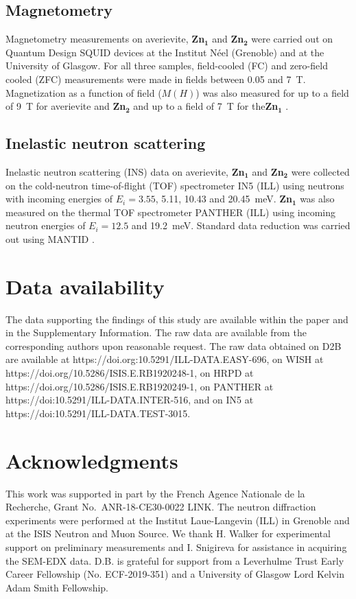 \documentclass[
sn-nature,
Numbered,
iicol]
{sn-jnl}%
\begin{document}
\subsection*{Magnetometry}
\label{SecSquid}
Magnetometry measurements on averievite, {\bf Zn$\mathbf {_1}$} and {\bf Zn$\mathbf {_2}$} were carried out on Quantum Design  SQUID devices at the Institut N\'eel (Grenoble) and at the University of Glasgow. For all three samples, field-cooled (FC) and zero-field cooled (ZFC) measurements were made in fields between 0.05 and 7~T. Magnetization as a function of field ($M(H)$) was also measured for up to a field of 9~T for averievite and {\bf Zn$\mathbf {_2}$} and up to a field of 7~T for the{\bf Zn$\mathbf {_1}$} .

\subsection*{Inelastic neutron scattering}
\label{SecINS}
Inelastic neutron scattering (INS) data on averievite, {\bf Zn$\mathbf {_1}$} and {\bf Zn$\mathbf {_2}$} were collected on the cold-neutron time-of-flight (TOF) spectrometer IN5 (ILL) using neutrons with incoming energies of $E_i=3.55$, 5.11, 10.43 and 20.45~meV. {\bf Zn$\mathbf {_1}$}  was also measured on the thermal TOF spectrometer PANTHER (ILL) \cite{Fak2022PantherILL, Panther_avv} using incoming neutron energies of $E_i=12.5$ and 19.2~meV.
Standard data reduction was carried out using MANTID
\cite{Mantid}. 


\section{Data availability}
The data supporting the findings of this study are available within the paper and in the Supplementary Information. The raw data are available from the corresponding authors upon reasonable request. 
The raw data obtained on D2B are available at https://doi.org:10.5291/ILL-DATA.EASY-696, 
on WISH at https://doi.org/10.5286/ISIS.E.RB1920248-1, 
on HRPD at https://doi.org/10.5286/ISIS.E.RB1920249-1, 
on PANTHER at https://doi:10.5291/ILL-DATA.INTER-516, 
and on IN5 at https://doi:10.5291/ILL-DATA.TEST-3015.



\section{Acknowledgments}
This work was supported in part by the French Agence Nationale de la Recherche, Grant No.\ ANR-18-CE30-0022 LINK. 
The neutron diffraction experiments were performed at the Institut Laue-Langevin (ILL) in Grenoble and at the ISIS Neutron and Muon Source. We thank H. Walker for experimental support on preliminary measurements and I. Snigireva for assistance in acquiring the SEM-EDX data. D.B. is grateful for support  from a Leverhulme Trust Early Career Fellowship (No. ECF-2019-351) and a University of Glasgow Lord Kelvin Adam Smith Fellowship.
\end{document}
